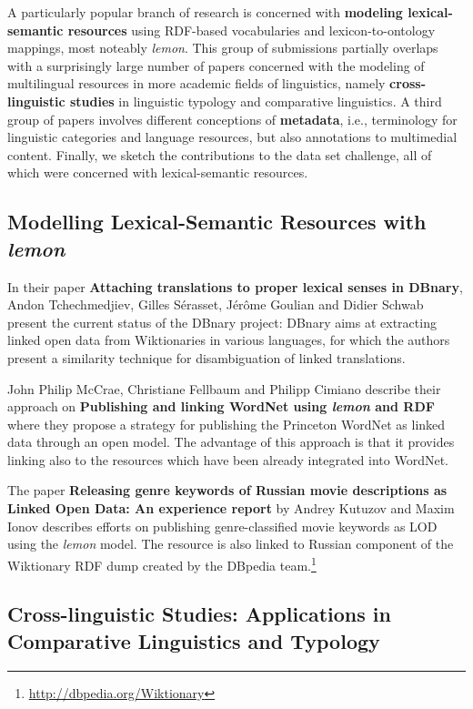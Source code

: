 A particularly popular branch of research is concerned with \textbf{modeling lexical-semantic resources} using RDF-based vocabularies and lexicon-to-ontology mappings, most noteably \emph{lemon}. 
This group of submissions partially overlaps with a surprisingly large number of papers concerned with the modeling of multilingual resources in more academic fields of linguistics, namely \textbf{cross-linguistic studies} in linguistic typology and comparative linguistics.
A third group of papers involves different conceptions of \textbf{metadata}, i.e., terminology for linguistic categories and language resources, but also annotations to multimedial content.
Finally, we sketch the contributions to the data set challenge, all of which were concerned with lexical-semantic resources.

\subsection{Modelling Lexical-Semantic Resources with \emph{lemon}}

	In their paper \textbf{Attaching translations to proper lexical senses in DBnary}, 
	Andon Tchechmedjiev, Gilles Sérasset, Jérôme Goulian and Didier Schwab 
	present	the current status of the DBnary project: DBnary aims at extracting linked open data from Wiktionaries in various languages, for which 
	the authors present a similarity technique for disambiguation of linked translations. 

	John Philip McCrae, Christiane Fellbaum and Philipp Cimiano describe their approach on \textbf{Publishing and linking WordNet using \emph{lemon} and RDF} where they
	propose a strategy for publishing the Princeton WordNet as linked data through an open model. 
	The advantage of this approach is that it provides linking also to the resources which have been already integrated into WordNet. 	

	The paper \textbf{Releasing genre keywords of Russian movie descriptions as Linked Open Data: An experience report} by Andrey Kutuzov and Maxim Ionov 
	describes efforts on publishing genre-classified movie keywords as LOD using the \emph{lemon} model. 
	The resource is also linked to Russian component of the Wiktionary RDF dump created by the DBpedia team.\footnote{
		\url{http://dbpedia.org/Wiktionary}
	}

\subsection{Cross-linguistic Studies: Applications in Comparative Linguistics and Typology}

